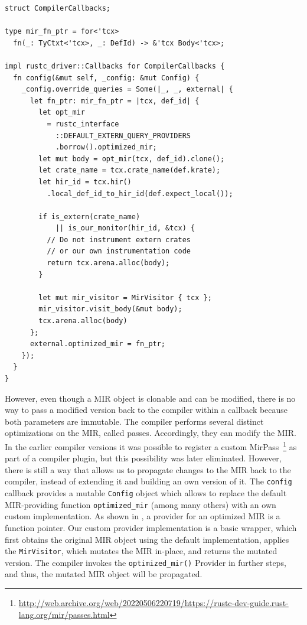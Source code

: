 \documentclass[paper=a4,%
  twoside,%
  BCOR4mm,%
  abstract=true,%
  toc=bibliography,%
  chapterprefix=true,%
  toc=bibliographynumbered,%
  open=right,%
  english,%
  pagesize=pdftex]{scrreprt}
\newcommand{\mir}{\ac{MIR}\xspace}
\begin{document}
\begin{lstlisting}[style=boxed, caption={The Rust compiler interface accepts an object which implements its callback trait, allowing us to execute code at different compilation phases}, label=lst:compiler-callbacks]
struct CompilerCallbacks;

type mir_fn_ptr = for<'tcx>
  fn(_: TyCtxt<'tcx>, _: DefId) -> &'tcx Body<'tcx>;

impl rustc_driver::Callbacks for CompilerCallbacks {
  fn config(&mut self, _config: &mut Config) {
    _config.override_queries = Some(|_, _, external| {
      let fn_ptr: mir_fn_ptr = |tcx, def_id| {
        let opt_mir
          = rustc_interface
            ::DEFAULT_EXTERN_QUERY_PROVIDERS
            .borrow().optimized_mir;
        let mut body = opt_mir(tcx, def_id).clone();
        let crate_name = tcx.crate_name(def.krate);
        let hir_id = tcx.hir()
          .local_def_id_to_hir_id(def.expect_local());

        if is_extern(crate_name)
            || is_our_monitor(hir_id, &tcx) {
          // Do not instrument extern crates
          // or our own instrumentation code
          return tcx.arena.alloc(body);
        }

        let mut mir_visitor = MirVisitor { tcx };
        mir_visitor.visit_body(&mut body);
        tcx.arena.alloc(body)
      };
      external.optimized_mir = fn_ptr;
    });
  }
}
\end{lstlisting}
However, even though a \mir object is clonable and can be modified, there is no way to pass a modified version back to the compiler within a callback because both parameters are immutable. The compiler performs several distinct optimizations on the \mir, called passes. Accordingly, they can modify the \mir. In the earlier compiler versions it was possible to register a custom MirPass~\footnote{\url{http://web.archive.org/web/20220506220719/https://rustc-dev-guide.rust-lang.org/mir/passes.html}} as part of a compiler plugin, but this possibility was later eliminated. However, there is still a way that allows us to propagate changes to the \mir back to the compiler, instead of extending it and building an own version of it. The \texttt{config} callback provides a mutable \texttt{Config} object which allows to replace the default \mir-providing function \texttt{optimized\string_mir} (among many others) with an own custom implementation. As shown in , a provider for an optimized \mir is a function pointer. Our custom provider implementation is a basic wrapper, which first obtains the original \mir object using the default implementation, applies the \texttt{MirVisitor}, which mutates the \mir in-place, and returns the mutated version. The compiler invokes the \texttt{optimized\string_mir()} Provider in further steps, and thus, the mutated \mir object will be propagated.
\end{document}
